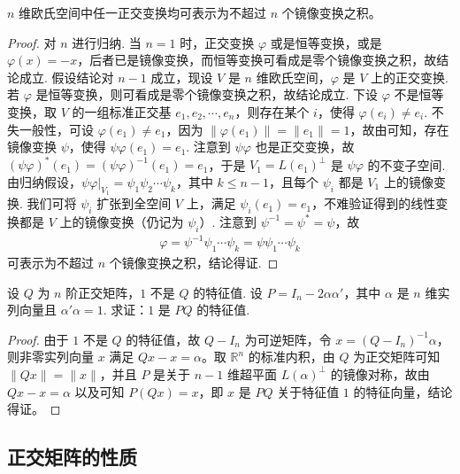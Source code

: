 \documentclass[../../main.tex]{subfiles}
\begin{document}
\begin{proposition}\label{proposition:例9.43}
\(n\) 维欧氏空间中任一正交变换均可表示为不超过 \(n\) 个镜像变换之积。
\end{proposition}
\begin{proof}
对 \(n\) 进行归纳. 当 \(n = 1\) 时，正交变换 \(\varphi\) 或是恒等变换，或是 \(\varphi(x) = -x\)，后者已是镜像变换，而恒等变换可看成是零个镜像变换之积，故结论成立. 假设结论对 \(n - 1\) 成立，现设 \(V\) 是 \(n\) 维欧氏空间，\(\varphi\) 是 \(V\) 上的正交变换. 若 \(\varphi\) 是恒等变换，则可看成是零个镜像变换之积，故结论成立. 下设 \(\varphi\) 不是恒等变换，取 \(V\) 的一组标准正交基 \(e_1,e_2,\cdots,e_n\)，则存在某个 \(i\)，使得 \(\varphi(e_i) \neq e_i\). 不失一般性，可设 \(\varphi(e_1) \neq e_1\)，因为 \(\|\varphi(e_1)\| = \|e_1\| = 1\)，故由可知，存在镜像变换 \(\psi\)，使得 \(\psi\varphi(e_1) = e_1\). 注意到 \(\psi\varphi\) 也是正交变换，故 \((\psi\varphi)^*(e_1) = (\psi\varphi)^{-1}(e_1) = e_1\)，于是 \(V_1 = L(e_1)^{\perp}\) 是 \(\psi\varphi\) 的不变子空间. 由归纳假设，\(\psi\varphi|_{V_1} = \psi_1\psi_2\cdots\psi_k\)，其中 \(k \leqslant  n - 1\)，且每个 \(\psi_i\) 都是 \(V_1\) 上的镜像变换. 我们可将 \(\psi_i\) 扩张到全空间 \(V\) 上，满足 \(\psi_i(e_1) = e_1\)，不难验证得到的线性变换都是 \(V\) 上的镜像变换（仍记为 \(\psi_i\)）. 注意到 \(\psi^{-1} = \psi^* = \psi\)，故
\begin{align*}
\varphi = \psi^{-1}\psi_1\cdots\psi_k = \psi\psi_1\cdots\psi_k
\end{align*}
可表示为不超过 \(n\) 个镜像变换之积，结论得证. 
\end{proof}

\begin{proposition}\label{proposition:例9.44}
设 \(Q\) 为 \(n\) 阶正交矩阵，\(1\) 不是 \(Q\) 的特征值. 设 \(P = I_n - 2\alpha\alpha'\)，其中 \(\alpha\) 是 \(n\) 维实列向量且 \(\alpha'\alpha = 1\). 求证：\(1\) 是 \(PQ\) 的特征值.
\end{proposition}
\begin{proof}
由于 \(1\) 不是 \(Q\) 的特征值，故 \(Q - I_n\) 为可逆矩阵，令 \(x = (Q - I_n)^{-1}\alpha\)，则非零实列向量 \(x\) 满足 \(Qx - x = \alpha\)。取 \(\mathbb{R}^n\) 的标准内积，由 \(Q\) 为正交矩阵可知 \(\|Qx\| = \|x\|\)，并且 \(P\) 是关于 \(n - 1\) 维超平面 \(L(\alpha)^{\perp}\) 的镜像对称，故由 \(Qx - x = \alpha\) 以及可知 \(P(Qx) = x\)，即 \(x\) 是 \(PQ\) 关于特征值 \(1\) 的特征向量，结论得证。
\end{proof}


\subsection{正交矩阵的性质}
\end{document}
